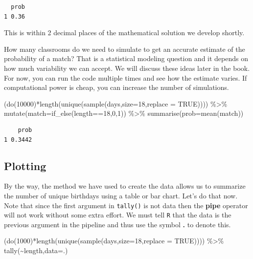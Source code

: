 \documentclass[
  letterpaper,
  DIV=11,
  numbers=noendperiod]{scrreprt}
\newenvironment{Shaded}{\begin{snugshade}}{\end{snugshade}}
\newcommand{\AttributeTok}[1]{\textcolor[rgb]{0.40,0.45,0.13}{#1}}
\newcommand{\ConstantTok}[1]{\textcolor[rgb]{0.56,0.35,0.01}{#1}}
\newcommand{\DecValTok}[1]{\textcolor[rgb]{0.68,0.00,0.00}{#1}}
\newcommand{\FunctionTok}[1]{\textcolor[rgb]{0.28,0.35,0.67}{#1}}
\newcommand{\NormalTok}[1]{\textcolor[rgb]{0.00,0.23,0.31}{#1}}
\newcommand{\SpecialCharTok}[1]{\textcolor[rgb]{0.37,0.37,0.37}{#1}}
\begin{document}
\begin{verbatim}
  prob
1 0.36
\end{verbatim}

This is within 2 decimal places of the mathematical solution we develop
shortly.

How many classrooms do we need to simulate to get an accurate estimate
of the probability of a match? That is a statistical modeling question
and it depends on how much variability we can accept. We will discuss
these ideas later in the book. For now, you can run the code multiple
times and see how the estimate varies. If computational power is cheap,
you can increase the number of simulations.

\begin{Shaded}
\begin{Highlighting}[]
\NormalTok{(}\FunctionTok{do}\NormalTok{(}\DecValTok{10000}\NormalTok{)}\SpecialCharTok{*}\FunctionTok{length}\NormalTok{(}\FunctionTok{unique}\NormalTok{(}\FunctionTok{sample}\NormalTok{(days,}\AttributeTok{size=}\DecValTok{18}\NormalTok{,}\AttributeTok{replace =} \ConstantTok{TRUE}\NormalTok{)))) }\SpecialCharTok{\%\textgreater{}\%}
  \FunctionTok{mutate}\NormalTok{(}\AttributeTok{match=}\FunctionTok{if\_else}\NormalTok{(length}\SpecialCharTok{==}\DecValTok{18}\NormalTok{,}\DecValTok{0}\NormalTok{,}\DecValTok{1}\NormalTok{)) }\SpecialCharTok{\%\textgreater{}\%}
  \FunctionTok{summarise}\NormalTok{(}\AttributeTok{prob=}\FunctionTok{mean}\NormalTok{(match))}
\end{Highlighting}
\end{Shaded}

\begin{verbatim}
    prob
1 0.3442
\end{verbatim}

\subsection{Plotting}\label{plotting}

By the way, the method we have used to create the data allows us to
summarize the number of unique birthdays using a table or bar chart.
Let's do that now. Note that since the first argument in
\texttt{tally()} is not data then the \textbf{pipe} operator will not
work without some extra effort. We must tell \texttt{R} that the data is
the previous argument in the pipeline and thus use the symbol \textbf{.}
to denote this.

\begin{Shaded}
\begin{Highlighting}[]
\NormalTok{(}\FunctionTok{do}\NormalTok{(}\DecValTok{1000}\NormalTok{)}\SpecialCharTok{*}\FunctionTok{length}\NormalTok{(}\FunctionTok{unique}\NormalTok{(}\FunctionTok{sample}\NormalTok{(days,}\AttributeTok{size=}\DecValTok{18}\NormalTok{,}\AttributeTok{replace =} \ConstantTok{TRUE}\NormalTok{)))) }\SpecialCharTok{\%\textgreater{}\%}
  \FunctionTok{tally}\NormalTok{(}\SpecialCharTok{\textasciitilde{}}\NormalTok{length,}\AttributeTok{data=}\NormalTok{.)}
\end{Highlighting}
\end{Shaded}
\end{document}
